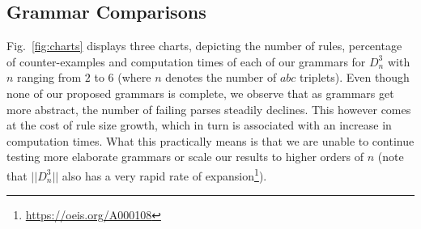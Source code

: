 \documentclass{llncs}
\begin{document}
\subsection{Grammar Comparisons}
Fig.~\ref{fig:charts} displays three charts, depicting the number of rules, percentage of counter-examples and computation times of each of our grammars for $D^3_n$ with $n$ ranging from $2$ to $6$ (where $n$ denotes the number of $abc$ triplets). Even though none of our proposed grammars is complete, we observe that as grammars get more abstract, the number of failing parses steadily declines. This however comes at the cost of rule size growth, which in turn is associated with an increase in computation times. What this practically means is that we are unable to continue testing more elaborate grammars or scale our results to higher orders of $n$ (note that $| \! | D^3_n | \! |$ also has a very rapid rate of expansion\footnote{\url{https://oeis.org/A000108}}).
\end{document}
